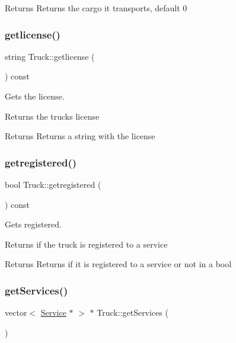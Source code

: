 \begin{DoxyReturn}{Returns}
Returns the cargo it transports, default 0 
\end{DoxyReturn}
\mbox{\label{class_truck_ae76a7ae2343557680ae915c6c6d42ff8}} 
\subsubsection{\texorpdfstring{getlicense()}{getlicense()}}
{\footnotesize\ttfamily string Truck\+::getlicense (\begin{DoxyParamCaption}{ }\end{DoxyParamCaption}) const}



Gets the license. 

Returns the truck\textquotesingle{}s license

\begin{DoxyReturn}{Returns}
Returns a string with the license 
\end{DoxyReturn}
\mbox{\label{class_truck_a830838ed22465cf27f56b911c3fadf13}} 
\subsubsection{\texorpdfstring{getregistered()}{getregistered()}}
{\footnotesize\ttfamily bool Truck\+::getregistered (\begin{DoxyParamCaption}{ }\end{DoxyParamCaption}) const}



Gets registered. 

Returns if the truck is registered to a service

\begin{DoxyReturn}{Returns}
Returns if it is registered to a service or not in a bool 
\end{DoxyReturn}
\mbox{\label{class_truck_a207506f38e78d7a5f065893295a2c00d}} 
\subsubsection{\texorpdfstring{get\+Services()}{getServices()}}
{\footnotesize\ttfamily vector$<$ \hyperlink{class_service}{Service} $\ast$ $>$ $\ast$ Truck\+::get\+Services (\begin{DoxyParamCaption}{ }\end{DoxyParamCaption})}



